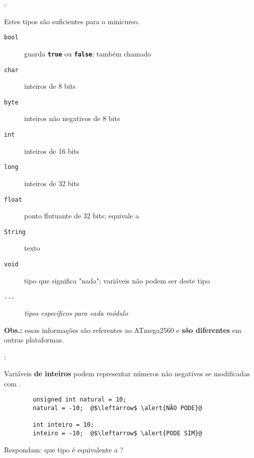 \begin{frame}{\insertsection: \insertsubsection}

	Estes tipos são suficientes para o minicurso.

	\begin{description}
		\item[\texttt{bool}] guarda \textbf{\texttt{true}} ou \textbf{\texttt{false}}; também chamado \texttt{}
		\item[\texttt{char}] inteiros de 8 bits
		\item[\texttt{byte}] inteiros não negativos de 8 bits
		\item[\texttt{int}] inteiros de 16 bits
		\item[\texttt{long}] inteiros de 32 bits
		\item[\texttt{float}] ponto flutuante de 32 bits; equivale a \texttt{}
		\item[\texttt{String}] texto
		\item[\texttt{void}] tipo que significa "nada"; variáveis não podem ser deste tipo
		\item[\texttt{...}] \textit{tipos específicos para cada módulo}
	\end{description}

	\vfill
	\textbf{Obs.:} essas informações são referentes ao ATmega2560 e \textbf{são diferentes} em outras plataformas.

\end{frame}


\begin{frame}[fragile]{\insertsection: \insertsubsection}

	Variáveis \textbf{de inteiros} podem representar números não negativos se modificadas com \texttt{}.
	\begin{verbatim}
		unsigned int natural = 10;
		natural = -10;  @$\leftarrow$ \alert{NÃO PODE}@

		int inteiro = 10;
		inteiro = -10;  @$\leftarrow$ \alert{PODE SIM}@
	\end{verbatim}

	\pause
	\bigskip
	Respondam: que tipo é equivalente a \texttt{}?\\
	\only<0|handout:2>{R: \texttt{\HighlightSpecial{byte}}}

\end{frame}


